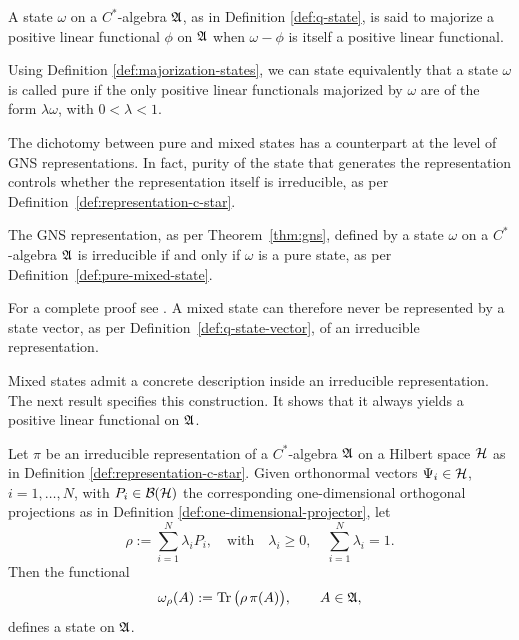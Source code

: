 \begin{definition}\label{def:majorization-states}
	A state $\omega$ on a $C^*$-algebra $\mathfrak{A}$, as in Definition \ref{def:q-state}, is said to majorize a positive linear functional $\phi$ on $\mathfrak{A}$ when $\omega-\phi$ is itself a positive linear functional.
\end{definition}

Using Definition \ref{def:majorization-states}, we can state equivalently that a state $\omega$ is called pure if the only positive linear functionals majorized by $\omega$ are of the form $\lambda\omega$, with $0 < \lambda < 1$.

The dichotomy between pure and mixed states has a counterpart at the level of GNS representations. In fact, purity of the state that generates the representation controls whether the representation itself is irreducible, as per Definition~\ref{def:representation-c-star}. 

\begin{proposition}
	\label{prop:irreducible-iff-pure}
	The GNS representation, as per Theorem~\ref{thm:gns}, defined by a state $\omega$ on a $C^*$-algebra $\mathfrak{A}$ is irreducible if and only if $\omega$ is a pure state, as per Definition~\ref{def:pure-mixed-state}.
\end{proposition}

	\noindent For a complete proof see \cite[Appendix~D, Proposition 2.6.2]{strocchiIntroductionMathematicalStructure2005}. A mixed state can therefore never be represented by a state vector, as per Definition~\ref{def:q-state-vector}, of an irreducible representation.

Mixed states admit a concrete description inside an irreducible representation. The next result specifies this construction. It shows that it always yields a positive linear functional on $\mathfrak{A}$.

\begin{proposition}
	\label{prop:density-matrix-state}
	Let $\pi$ be an irreducible representation of a $C^*$-algebra $\mathfrak{A}$ on a Hilbert space $\H$ as in Definition \ref{def:representation-c-star}. Given orthonormal vectors $\Psi_i \in \H$, $i=1,\dots,N$, with $P_i \in \mathcal{B}(\H)$ the corresponding one-dimensional orthogonal projections as in Definition \ref{def:one-dimensional-projector}, let
	\begin{equation}
		\label{eq:density-matrix}
		\rho := \sum_{i=1}^N \lambda_i P_i, \quad \text{with} \quad \lambda_i \ge 0, \quad \sum_{i=1}^N \lambda_i = 1.
	\end{equation}
	Then the functional
	\begin{equation}
		\label{eq:density-matrix-state}
		\omega_\rho(A) := \Tr\big(\rho\,\pi(A)\big), \qquad A \in \mathfrak{A},
	\end{equation}
	defines a state on $\mathfrak{A}$.
\end{proposition}

